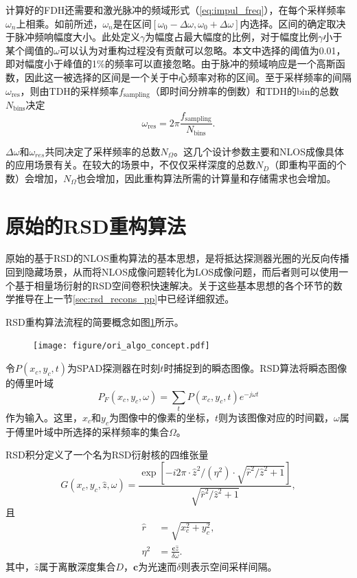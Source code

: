 \documentclass[master]{shtthesis}             %
\begin{document}
计算好的FDH还需要和激光脉冲的频域形式（\ref{eq:impul_freq}），在每个采样频率$\omega_n$上相乘。如前所述，$\omega_n$是在区间$[\omega_0-\Delta\omega,\omega_0+\Delta\omega]$内选择。区间的确定取决于脉冲频响幅度大小。此处定义$\gamma$为幅度占最大幅度的比例，对于幅度比例$\gamma$小于某个阈值的$\omega$可以认为对重构过程没有贡献可以忽略。本文中选择的阈值为0.01，即对幅度小于峰值的1\%的频率可以直接忽略。由于脉冲的频域响应是一个高斯函数，因此这一被选择的区间是一个关于中心频率对称的区间。至于采样频率的间隔$\omega_{\text{res}}$，则由TDH的采样频率$f_{\text{sampling}}$（即时间分辨率的倒数）和TDH的bin的总数$N_{\text{bins}}$决定
\begin{equation}
  \omega_{\text{res}} = 2\pi \frac{f_{\text{sampling}}}{N_{\text{bins}}}.
\end{equation}

$\Delta\omega$和$\omega_{res}$共同决定了采样频率的总数$N_\Omega$。这几个设计参数主要和NLOS成像具体的应用场景有关。在较大的场景中，不仅仅采样深度的总数$N_D$（即重构平面的个数）会增加，$N_\Omega$也会增加，因此重构算法所需的计算量和存储需求也会增加。


\section{原始的RSD重构算法}\label{sec:ori_rsd_algo}

原始的基于RSD的NLOS重构算法的基本思想，是将抵达探测器光圈的光反向传播回到隐藏场景，从而将NLOS成像问题转化为LOS成像问题，而后者则可以使用一个基于相量场衍射的RSD空间卷积快速解决\citep{Liu}。关于这些基本思想的各个环节的数学推导在上一节\ref{sec:rsd_recons_pp}中已经详细叙述。

RSD重构算法流程的简要概念如图\ref{fig:ori_algo_concept}所示。
\begin{figure}[!tb]
  \centering
  \texttt{[image: figure/ori\_algo\_concept.pdf]}
  \label{fig:ori_algo_concept}
\end{figure}
令$P(x_c,y_c,t)$为SPAD探测器在时刻$t$时捕捉到的瞬态图像。RSD算法将瞬态图像的傅里叶域
\begin{equation}
  P_F(x_c,y_c,\omega) = \sum_t P(x_c,y_c,t)e^{-j\omega t}
\end{equation}
作为输入。这里，$x_c$和$y_c$为图像中的像素的坐标，$t$则为该图像对应的时间戳，$\omega$属于傅里叶域中所选择的采样频率的集合$\Omega$。

RSD积分定义了一个名为RSD衍射核的四维张量
\begin{equation}\label{eq:kernel}
  G(x_c,y_c,\hat{z},\omega) = \frac{\exp\left[-i2\pi\cdot\hat{z}^2/(\eta^2)\cdot\sqrt{\hat{r}^2/\hat{z}^2+1}\right]}{\sqrt{\hat{r}^2/\hat{z}^2+1}},
\end{equation}
且
\begin{align}
  \hat{r} &= \sqrt{x_c^2+y_c^2}\label{eq:rxy},\\
  \eta^2 &= \frac{\mathbf{c}\hat{z}}{\delta\omega}.
\end{align}
其中，$\hat{z}$属于离散深度集合$D$，$\mathbf{c}$为光速而$\delta$则表示空间采样间隔。
\end{document}
